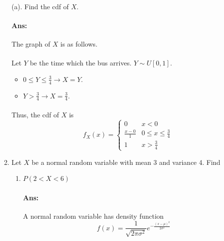 \documentclass[letterpaper,12pt]{article}
\begin{document}
\begin{enumerate}
\paragraph{}(a). Find the cdf of $X$.
\paragraph{Ans:} The graph of $X$ is as follows.

\vspace{5mm}

\paragraph{}Let $Y$ be the time which the bus arrives. $Y \sim U[0,1]$.
\begin{itemize}
    \item $0 \le Y \le \frac{3}{4} \to X = Y$.
    \item $Y > \frac{3}{4}\to X = \frac{3}{4}$.
\end{itemize}
\paragraph{}Thus, the cdf of $X$ is
\[ f_X(x) = \begin{cases}
    0 & x < 0 \\
    \frac{x-0}{1} & 0 \le x \le\frac{3}{4} \\
    1 & x > \frac{3}{4}
    \end{cases}
\]
\item Let $X$ be a normal random variable with mean 3 and variance 4. Find
    \begin{enumerate}[label=(\alph*).]
        \item  $P(2 < X < 6)$
            \paragraph{Ans:} A normal random variable has density function
            \[
                f(x) = \frac{1}{\sqrt{2\pi\sigma^2}}e^{-\frac{(x-\mu)^2}{2\sigma^2}}
            \]

\end{enumerate}
\end{enumerate}
\end{document}
